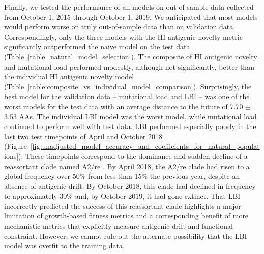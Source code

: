 Finally, we tested the performance of all models on out-of-sample data collected from October 1, 2015 through October 1, 2019.
We anticipated that most models would perform worse on truly out-of-sample data than on validation data.
Correspondingly, only the three models with the HI antigenic novelty metric significantly outperformed the naive model on the test data (Table~\ref{table_natural_model_selection}).
The composite of HI antigenic novelty and mutational load performed modestly, although not significantly, better than the individual HI antigenic novelty model (Table~\ref{table:composite_vs_individual_model_comparison}).
Surprisingly, the best model for the validation data -- mutational load and LBI -- was one of the worst models for the test data with an average distance to the future of 7.70 $\pm$ 3.53 AAs.
The individual LBI model was the worst model, while mutational load continued to perform well with test data.
LBI performed especially poorly in the last two test timepoints of April and October 2018 (Figure~\ref{fig:unadjusted_model_accuracy_and_coefficients_for_natural_populations}).
These timepoints correspond to the dominance and sudden decline of a reassortant clade named A2/re \citep{Potter2019}.
By April 2018, the A2/re clade had risen to a global frequency over 50\% from less than 15\% the previous year, despite an absence of antigenic drift.
By October 2018, this clade had declined in frequency to approximately 30\% and, by October 2019, it had gone extinct.
That LBI incorrectly predicted the success of this reassortant clade highlights a major limitation of growth-based fitness metrics and a corresponding benefit of more mechanistic metrics that explicitly measure antigenic drift and functional constraint.
However, we cannot rule out the alternate possibility that the LBI model was overfit to the training data.

